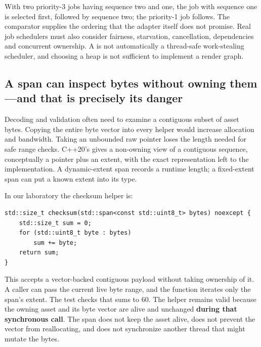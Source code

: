 With two priority-3 jobs having sequence two and one, the job with sequence one is selected first, followed by sequence two; the priority-1 job follows. The comparator supplies the ordering that the adapter itself does not promise. Real job schedulers must also consider fairness, starvation, cancellation, dependencies and concurrent ownership. A  is not automatically a thread-safe work-stealing scheduler, and choosing a heap is not sufficient to implement a render graph.

\subsection{A span can inspect bytes without owning them---and that is precisely its danger}\label{05-engine-i-ch005-a-span-can-inspect-bytes-without-owning-themand-that-is-precisely-its-danger}

\hypertarget{05-engine-i-ch005-a-span-can-inspect-bytes-without-owning-themand-that-is-precisely-its-danger}{}

Decoding and validation often need to examine a contiguous subset of asset bytes. Copying the entire byte vector into every helper would increase allocation and bandwidth. Taking an unbounded raw pointer loses the length needed for safe range checks. C++20's  gives a non-owning view of a contiguous sequence, conceptually a pointer plus an extent, with the exact representation left to the implementation. A dynamic-extent span records a runtime length; a fixed-extent span can put a known extent into its type.

In our laboratory the checksum helper is:

\begin{verbatim}
std::size_t checksum(std::span<const std::uint8_t> bytes) noexcept {
    std::size_t sum = 0;
    for (std::uint8_t byte : bytes)
        sum += byte;
    return sum;
}
\end{verbatim}

This accepts a vector-backed contiguous payload without taking ownership of it. A caller can pass the current live byte range, and the function iterates only the span's extent. The test checks that  sums to 60. The helper remains valid because the owning asset and its byte vector are alive and unchanged \textbf{during that synchronous call}. The span does not keep the asset alive, does not prevent the vector from reallocating, and does not synchronize another thread that might mutate the bytes.

